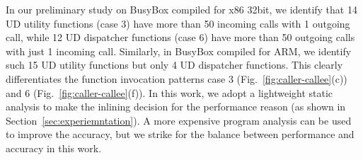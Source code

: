 In our preliminary study on BusyBox compiled for x86 32bit, we identify that 14 UD utility functions (case 3) have more than 50 incoming calls with 1 outgoing call, while 12 UD dispatcher functions (case 6) have more than 50 outgoing calls with just 1 incoming call.  Similarly, in BusyBox compiled for ARM, we identify such 15 UD utility functions but only 4 UD dispatcher functions. This clearly differentiates the function invocation patterns case 3 (Fig.~\ref{fig:caller-callee}(c)) and 6 (Fig.~\ref{fig:caller-callee}(f)).
In this work, we adopt a lightweight static analysis to make the inlining decision for the performance reason (as shown in Section~\ref{sec:experiemntation}).
A more expensive program analysis can be used to improve the accuracy, but we strike for the balance between performance and accuracy in this work.



